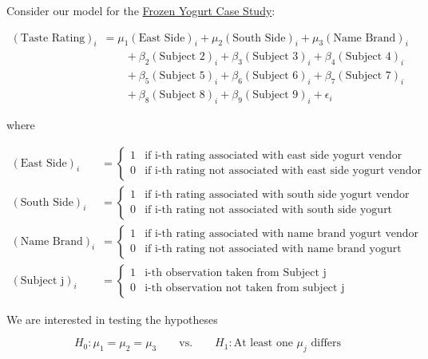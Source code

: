 \documentclass[
]{book}
\theoremstyle{plain}
\theoremstyle{mydefn}
\theoremstyle{myexmpl}
\theoremstyle{remark}
\begin{document}
Consider our model for the \protect\hyperlink{CaseYogurt}{Frozen Yogurt Case Study}:

\[
\begin{aligned}
  (\text{Taste Rating})_i &= \mu_1 (\text{East Side})_i + \mu_2 (\text{South Side})_i + \mu_3 (\text{Name Brand})_i \\
    &\qquad + \beta_2 (\text{Subject 2})_i + \beta_3 (\text{Subject 3})_i + \beta_4 (\text{Subject 4})_i \\
    &\qquad + \beta_5 (\text{Subject 5})_i + \beta_6 (\text{Subject 6})_i + \beta_7 (\text{Subject 7})_i \\
    &\qquad + \beta_8 (\text{Subject 8})_i + \beta_9 (\text{Subject 9})_i + \epsilon_i
\end{aligned}
\]

where

\[
\begin{aligned}
  (\text{East Side})_i &= \begin{cases}
    1 & \text{if i-th rating associated with east side yogurt vendor} \\
    0 & \text{if i-th rating not associated with east side yogurt vendor}
    \end{cases} \\
  (\text{South Side})_i &= \begin{cases}
    1 & \text{if i-th rating associated with south side yogurt vendor} \\
    0 & \text{if i-th rating not associated with south side yogurt vendor}
    \end{cases} \\
  (\text{Name Brand})_i &= \begin{cases}
    1 & \text{if i-th rating associated with name brand yogurt vendor} \\
    0 & \text{if i-th rating not associated with name brand yogurt vendor}
    \end{cases} \\
  (\text{Subject j})_i &= \begin{cases}
  1 & \text{i-th observation taken from Subject j} \\
  0 & \text{i-th observation not taken from subject j}
  \end{cases}
\end{aligned}
\]

We are interested in testing the hypotheses

\[H_0: \mu_1 = \mu_2 = \mu_3 \qquad \text{vs.} \qquad H_1: \text{At least one } \mu_j \text{ differs}\]
\end{document}

